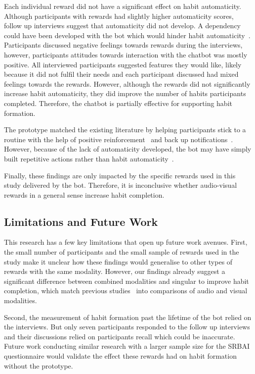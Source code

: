 \documentclass{scaffold/sigchi}
\begin{document}
Each individual reward did not have a significant effect on habit automaticity. Although participants with rewards had slightly higher automaticity scores, follow up interviews suggest that automaticity did not develop. A dependency could have been developed with the bot which would hinder habit automaticity~\cite{article_beyond_self_tracking_designing_apps}. Participants discussed negative feelings towards rewards during the interviews, however, participants attitudes towards interaction with the chatbot was mostly positive. All interviewed participants suggested features they would like, likely because it did not fulfil their needs and each participant discussed had mixed feelings towards the rewards. However, although the rewards did not significantly increase habit automaticity, they did improve the number of habits participants completed. Therefore, the chatbot is partially effective for supporting habit formation.

The prototype matched the existing literature by helping participants stick to a routine with the help of positive reinforcement~\cite{positive_reinforcement_pro} and back up notifications~\cite{article_beyond_self_tracking_designing_apps}. However, because of the lack of automaticity developed, the bot may have simply built repetitive actions rather than habit automaticity~\cite{coaching_not_that_good}.

Finally, these findings are only impacted by the specific rewards used in this study delivered by the bot. Therefore, it is inconclusive whether audio-visual rewards in a general sense increase habit completion.


\subsection{Limitations and Future Work}
This research has a few key limitations that open up future work avenues. First, the small number of participants and the small sample of rewards used in the study make it unclear how these findings would generalise to other types of rewards with the same modality. However, our findings already suggest a significant difference between combined modalities and singular to improve habit completion, which match previous studies~\cite{benefits_of_audio_visual_1,benefits_of_audio_visual_2,comparison_of_auditory_visual_feedback} into comparisons of audio and visual modalities.

Second, the measurement of habit formation past the lifetime of the bot relied on the interviews. But only seven participants responded to the follow up interviews and their discussions relied on participants recall which could be inaccurate. Future work conducting similar research with a larger sample size for the SRBAI questionnaire would validate the effect these rewards had on habit formation without the prototype.
\end{document}
